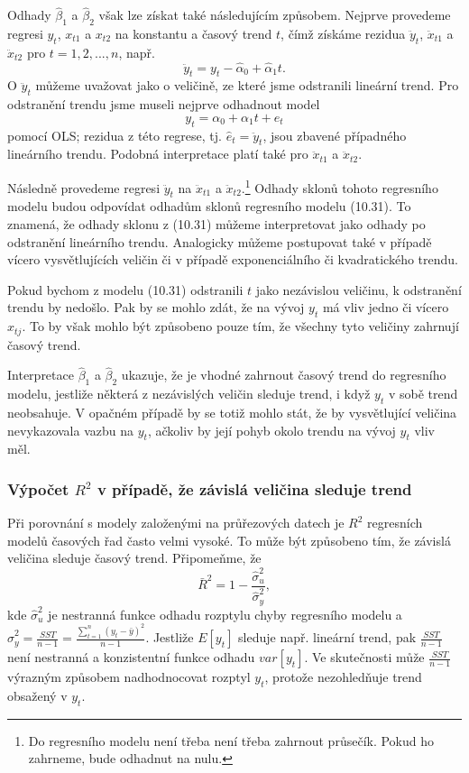 Odhady $\hat{\beta}_1$ a $\hat{\beta}_2$ však lze získat také 
následujícím způsobem. Nejprve provedeme regresi $y_t$, $x_{t1}$ a $x_{t2}$ na konstantu a 
časový trend $t$, čímž získáme rezidua $\ddot{y}_t$, 
$\ddot{x}_{t1}$ a $\ddot{x}_{t2}$ pro $t = 1, 2, ..., n$, např.
\begin{equation}
\ddot{y}_t = y_t - \hat{\alpha}_0 + \hat{\alpha}_1 t.
\end{equation}
O $\ddot{y}_t$ můžeme uvažovat jako o veličině, ze které jsme 
odstranili lineární trend. Pro odstranění trendu jsme museli nejprve
odhadnout model
\begin{equation}
y_t = \alpha_0 + \alpha_1 t + e_t
\end{equation}
pomocí OLS; rezidua z této regrese, tj. $\hat{e}_t = \ddot{y}_t$, 
jsou zbavené případného lineárního trendu. Podobná interpretace 
platí také pro $\ddot{x}_{t1}$ a $\ddot{x}_{t2}$.

Následně provedeme regresi $\ddot{y}_t$ na $\ddot{x}_{t1}$ a 
$\ddot{x}_{t2}$.\footnote{Do regresního modelu není třeba není 
třeba zahrnout průsečík. Pokud ho zahrneme, bude odhadnut na nulu.} 
Odhady sklonů tohoto regresního modelu budou odpovídat odhadům 
sklonů regresního modelu (10.31). To znamená, že odhady sklonu z 
(10.31) můžeme interpretovat jako odhady po odstranění lineárního 
trendu. Analogicky můžeme postupovat také v případě vícero 
vysvětlujících veličin či v případě exponenciálního či 
kvadratického trendu.

Pokud bychom z modelu (10.31) odstranili $t$ jako nezávislou 
veličinu, k odstranění trendu by nedošlo. Pak by se mohlo zdát, 
že na vývoj $y_t$ má vliv jedno či vícero $x_{tj}$. To by však 
mohlo být způsobeno pouze tím, že všechny tyto veličiny zahrnují 
časový trend.

Interpretace $\hat{\beta}_1$ a $\hat{\beta}_2$ ukazuje, že je vhodné 
zahrnout časový trend do regresního modelu, jestliže některá z 
nezávislých veličin sleduje trend, i když $y_t$ v sobě trend 
neobsahuje. V opačném případě by se totiž mohlo stát, že by 
vysvětlující veličina nevykazovala vazbu na $y_t$, ačkoliv by 
její pohyb okolo trendu na vývoj $y_t$ vliv měl.

\subsubsection{Výpočet $R^2$ v případě, že závislá veličina 
sleduje trend}

Při porovnání s modely založenými na průřezových datech je $R^2$ regresních modelů časových řad často velmi 
vysoké.
To může být způsobeno tím, že závislá veličina sleduje 
časový trend. Připomeňme, že
\begin{equation}
\bar{R}^2 = 1 - \frac{\hat{\sigma}^2_u}{\hat{\sigma}^2_y},
\end{equation}
kde $\hat{\sigma}^2_u$ je nestranná funkce odhadu rozptylu chyby 
regresního modelu a $\hat{\sigma}^2_y = \frac{SST}{n - 1} = 
\frac{\sum_{t = 1}^n(y_t - \bar{y})^2}{n - 1}$. Jestliže $E[y_t]$ 
sleduje např. lineární trend, pak $\frac{SST}{n - 1}$ není 
nestranná a konzistentní funkce odhadu $var[y_t]$. Ve skutečnosti 
může $\frac{SST}{n - 1}$ výrazným způsobem nadhodnocovat rozptyl 
$y_t$, protože nezohledňuje trend obsažený v $y_t$.

